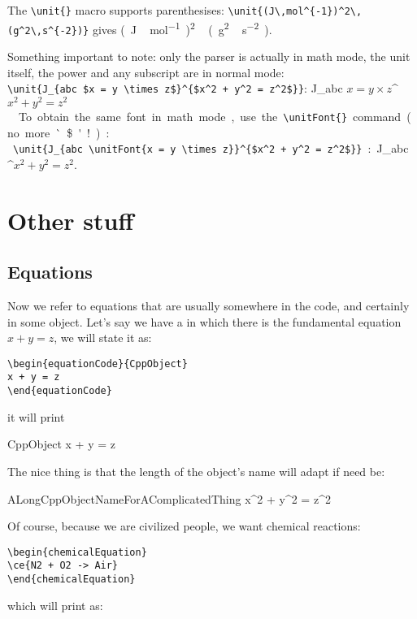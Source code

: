 \documentclass{documentation}
\begin{document}
The \verb!\unit{}! macro supports parenthesises:
\verb!\unit{(J\,mol^{-1})^2\,(g^2\,s^{-2})}! gives
\unit{(J\,mol^{-1})^2\,(g^2\,s^{-2})}.

Something important to note: only the parser is
actually in math mode, the unit itself, the power
and any subscript are in normal mode:\\
\verb!\unit{J_{abc $x = y \times z$}^{$x^2 + y^2 = z^2$}}!:
\unit{J_{abc $x = y \times z$}^{$x^2 + y^2 = z^2$}}.
\smallskip

To obtain the same font in math mode, use the \verb!\unitFont{}!
command (no more `\$'!):\\
\verb!\unit{J_{abc \unitFont{x = y \times z}}^{$x^2 + y^2 = z^2$}}!:
\unit{J_{abc }^{$x^2 + y^2 = z^2$}}.

\chapter{Other stuff}

\section{Equations}

Now we refer to equations that are usually somewhere in the
code, and certainly in some object. Let's say we have a
in which there is the fundamental equation
$x + y = z$, we will state it as:
\begin{verbatim}
\begin{equationCode}{CppObject}
x + y = z
\end{equationCode}
\end{verbatim}
it will print
\begin{equationCode}{CppObject}
x + y = z
\label{eqCode}
\end{equationCode}
The nice thing is that the length of the object's name will adapt
if need be:
\begin{equationCode}{ALongCppObjectNameForAComplicatedThing}
x^2 + y^2 = z^2
\end{equationCode}

Of course, because we are civilized people, we want chemical
reactions:
\begin{verbatim}
\begin{chemicalEquation}
\ce{N2 + O2 -> Air}
\end{chemicalEquation}
\end{verbatim}
which will print as:
\begin{chemicalEquation}
\label{chemEq}
\end{chemicalEquation}
\end{document}
